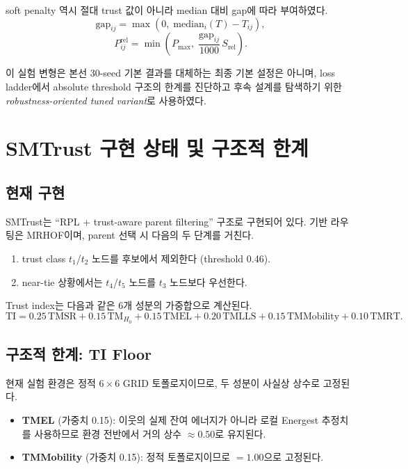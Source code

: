 \documentclass[12pt,a4paper]{article}
\begin{document}
soft penalty 역시 절대 trust 값이 아니라 median 대비 gap에 따라 부여하였다.
\begin{equation}
  \mathrm{gap}_{ij} = \max(0,\; \mathrm{median}_i(T) - T_{ij}),
\end{equation}
\begin{equation}
  P^\text{rel}_{ij} = \min\!\left(P_\text{max},\;
  \frac{\mathrm{gap}_{ij}}{1000}\, S_\text{rel}\right).
\end{equation}

이 실험 변형은 본선 30-seed 기본 결과를 대체하는 최종 기본 설정은 아니며,
loss ladder에서 absolute threshold 구조의 한계를 진단하고
후속 설계를 탐색하기 위한 \emph{robustness-oriented tuned variant}로 사용하였다.

\section{SMTrust 구현 상태 및 구조적 한계}
\label{sec:smtrust}

\subsection{현재 구현}

SMTrust는 ``RPL + trust-aware parent filtering'' 구조로 구현되어 있다.
기반 라우팅은 MRHOF이며, parent 선택 시 다음의 두 단계를 거친다.
\begin{enumerate}
  \item trust class $t_1$/$t_2$ 노드를 후보에서 제외한다 (threshold 0.46).
  \item near-tie 상황에서는 $t_4$/$t_5$ 노드를 $t_3$ 노드보다 우선한다.
\end{enumerate}

Trust index는 다음과 같은 6개 성분의 가중합으로 계산된다.
\begin{equation}
  \text{TI} = 0.25\,\text{TMSR} + 0.15\,\text{TM}_{H_0}
             + 0.15\,\text{TMEL} + 0.20\,\text{TMLLS}
             + 0.15\,\text{TMMobility} + 0.10\,\text{TMRT}.
\end{equation}

\subsection{구조적 한계: TI Floor}

현재 실험 환경은 정적 $6\times6$ GRID 토폴로지이므로, 두 성분이 사실상 상수로 고정된다.
\begin{itemize}
  \item \textbf{TMEL} (가중치 0.15): 이웃의 실제 잔여 에너지가 아니라
  로컬 Energest 추정치를 사용하므로 환경 전반에서 거의 상수 $\approx 0.50$로 유지된다.
  \item \textbf{TMMobility} (가중치 0.15): 정적 토폴로지이므로 $=1.00$으로 고정된다.
\end{itemize}
\end{document}

